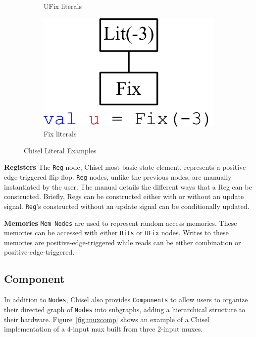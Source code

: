 \begin{figure}[b]
\begin{subfigure}[t]{0.22\textwidth}
  \caption{UFix literals}
  \label{fig:ufix}
  \end{subfigure}
  \hfill
  \begin{subfigure}[t]{0.22\textwidth}
  \centering
  \includegraphics[width=\textwidth]{figures/fix.pdf}
  \caption{Fix literals}
  \label{fig:fix}
  \end{subfigure}
\caption{Chisel Literal Examples}
\label{fig:lits}
\end{figure}

{\bf Registers} The {\tt Reg} node, Chisel most basic state element,
represents a positive-edge-triggered flip-flop. {\tt Reg} nodes, unlike the
previous nodes, are manually instantiated by the user. The manual
details the different ways that a Reg can be constructed. Briefly,
Regs can be constructed either with or without an update signal.
{\tt Reg}'s constructed without an update signal can
be conditionally updated.

{\bf Memories} {\tt Mem Nodes} are used to represent random access
memories. These memories can be accessed with either {\tt Bits} or
{\tt UFix} nodes. Writes to these memories are positive-edge-triggered while
reads can be either combination or positive-edge-triggered.

\subsection{Component}
In addition to {\tt Nodes}, Chisel also provides {\tt Components} to allow users
to organize their directed graph of {\tt Nodes} into subgraphs, adding a
hierarchical structure to their hardware. Figure~\ref{fig:muxcomp} shows an
example of a Chisel implementation of a 4-input mux built from three 2-input muxes.

